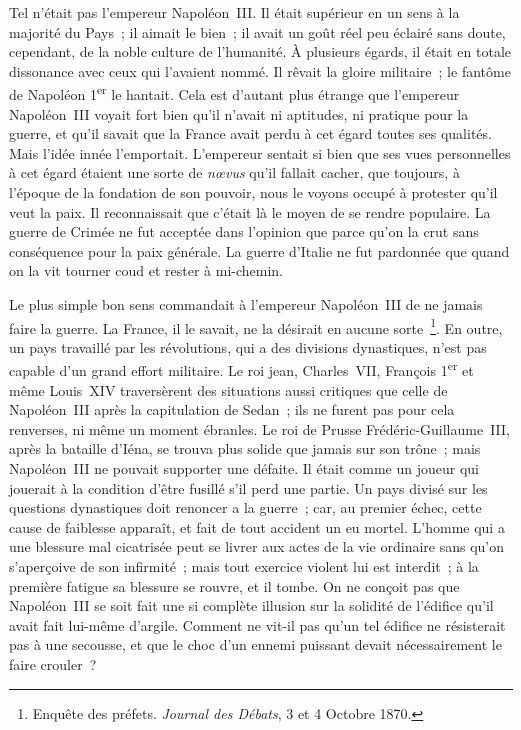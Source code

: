 \documentclass[french,twoside]{book} %
\begin{document}
Tel n’était pas l’empereur Napoléon III. Il était supérieur en un sens à la majorité du Pays ; il aimait le bien ; il avait un goût réel peu éclairé sans doute, cependant, de la noble culture de l’humanité. À plusieurs égards, il était en totale dissonance avec ceux qui l’avaient nommé. Il rêvait la gloire militaire ; le fantôme de Napoléon 1\textsuperscript{er} le hantait. Cela est d’autant plus étrange que l’empereur Napoléon III voyait fort bien qu’il n’avait ni aptitudes, ni pratique pour la guerre, et qu’il savait que la France avait perdu à cet égard toutes ses qualités. Mais l’idée innée l’emportait. L’empereur sentait si bien que ses vues personnelles à cet égard étaient une sorte de {\itshape nœvus} qu’il fallait cacher, que toujours, à l’époque de la fondation de son pouvoir, nous le voyons occupé à protester qu’il veut la paix. Il reconnaissait que c’était là le moyen de se rendre populaire. La guerre de Crimée ne fut acceptée dans l’opinion que parce qu’on la crut sans conséquence pour la paix générale. La guerre d’Italie ne fut pardonnée que quand on la vit tourner coud et rester à mi-chemin.\par
Le plus simple bon sens commandait à l’empereur Napoléon III de ne jamais faire la guerre. La France, il le savait, ne la désirait en aucune sorte \footnote{ Enquête des préfets. {\itshape Journal des Débats}, 3 et 4 Octobre 1870.}. En outre, un pays travaillé par les révolutions, qui a des divisions dynastiques, n’est pas capable d’un grand effort militaire. Le roi jean, Charles VII, François 1\textsuperscript{er} et même Louis XIV traversèrent des situations aussi critiques que celle de Napoléon III après la capitulation de Sedan ; ils ne furent pas pour cela renverses, ni même un moment ébranles. Le roi de Prusse Frédéric-Guillaume III, après la bataille d’Iéna, se trouva plus solide que jamais sur son trône ; mais Napoléon III ne pouvait supporter une défaite. Il était comme un joueur qui jouerait à la condition d’être fusillé s’il perd une partie. Un pays divisé sur les questions dynastiques doit renoncer a la guerre ; car, au premier échec, cette cause de faiblesse apparaît, et fait de tout accident un eu mortel. L’homme qui a une blessure mal cicatrisée peut se livrer aux actes de la vie ordinaire sans qu’on s’aperçoive de son infirmité ; mais tout exercice violent lui est interdit ; à la première fatigue sa blessure se rouvre, et il tombe. On ne conçoit pas que Napoléon III se soit fait une si complète illusion sur la solidité de l’édifice qu’il avait fait lui-même d’argile. Comment ne vit-il pas qu’un tel édifice ne résisterait pas à une secousse, et que le choc d’un ennemi puissant devait nécessairement le faire crouler ? \par
\end{document}
